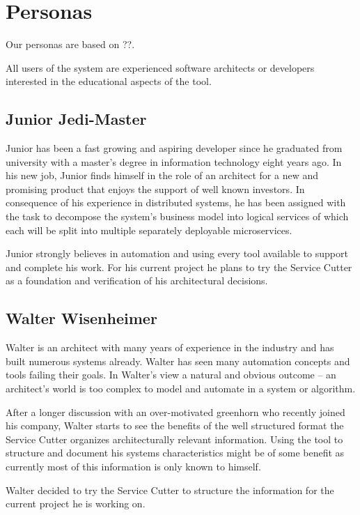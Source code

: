 
\section{Personas}

Our personas are based on ??. %

All users of the system are experienced software architects or developers interested in the educational aspects of the tool.

\subsection{Junior Jedi-Master}

Junior has been a fast growing and aspiring developer since he graduated from university with a master's degree in information technology eight years ago. In his new job, Junior finds himself in the role of an architect for a new and promising product that enjoys the support of well known investors. In consequence of his experience in distributed systems, he has been assigned with the task to decompose the system's business model into logical services of which each will be split into multiple separately deployable microservices. 

Junior strongly believes in automation and using every tool available to support and complete his work. For his current project he plans to try the Service Cutter as a foundation and verification of his architectural decisions. 


\subsection{Walter Wisenheimer}

Walter is an architect with many years of experience in the industry and has built numerous systems already. Walter has seen many automation concepts and tools failing their goals. In Walter's view a natural and obvious outcome -- an architect's world is too complex to model and automate in a system or algorithm. 

After a longer discussion with an over-motivated greenhorn who recently joined his company, Walter starts to see the benefits of the well structured format the Service Cutter organizes architecturally relevant information. Using the tool to structure and document his systems characteristics might be of some benefit as currently most of this information is only known to himself. 

Walter decided to try the Service Cutter to structure the information for the current project he is working on.

